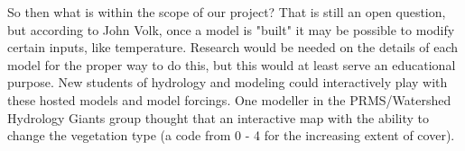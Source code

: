 \documentclass[
11pt, %
a4paper, %
oneside, %
twoside, %
headinclude,footinclude, %
BCOR5mm, %
]{scrartcl}
\begin{document}
So then what is within the scope of our project? That is still an open question, but
according to John Volk, once a model is "built" it may be possible to modify certain 
inputs, like temperature. Research would be needed on the details of each model for
the proper way to do this, but this would at least serve an educational purpose. New students
of hydrology and modeling could interactively play with these hosted models and model 
forcings. One modeller in the PRMS/Watershed Hydrology Giants group thought that 
an interactive map with the ability to change the vegetation type (a code from 0 - 4 for the
increasing extent of cover). 




\end{document}
